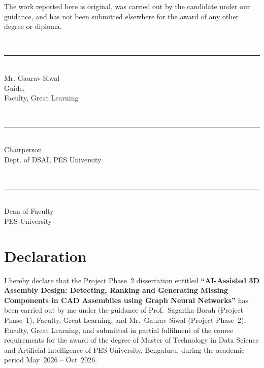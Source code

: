 \documentclass[12pt,oneside,a4paper]{report}
\begin{document}
The work reported here is original, was carried out by the candidate under
our guidance, and has not been submitted elsewhere for the award of any other
degree or diploma.

\vspace{2.5cm}

\begin{center}
\begin{minipage}[t]{0.48\textwidth}
\centering
\vspace*{1.5cm}\\
\rule{5cm}{0.4pt}\\
Mr. Gaurav Siwal\\
Guide,\\
Faculty, Great Learning
\end{minipage}
\end{center}

\vspace{2cm}

\noindent
\begin{minipage}[t]{0.48\textwidth}
\centering
\vspace*{1.5cm}\\
\rule{5cm}{0.4pt}\\
Chairperson\\
Dept. of DSAI, PES University
\end{minipage}
\hfill
\begin{minipage}[t]{0.48\textwidth}
\centering
\vspace*{1.5cm}\\
\rule{5cm}{0.4pt}\\
Dean of Faculty\\
PES University
\end{minipage}

\chapter*{Declaration}
\thispagestyle{plain}

I hereby declare that the Project Phase~2 dissertation entitled
\textbf{``AI-Assisted 3D Assembly Design: Detecting, Ranking and Generating
Missing Components in CAD Assemblies using Graph Neural Networks''} has been
carried out by me under the guidance of Prof.~Sagarika Borah (Project
Phase~1), Faculty, Great Learning, and Mr.~Gaurav Siwal (Project Phase~2),
Faculty, Great Learning, and submitted in partial
fulfilment of the course requirements for the award of the degree of Master
of Technology in Data Science and Artificial Intelligence of PES University,
Bengaluru, during the academic period May~2026 -- Oct~2026.
\end{document}

